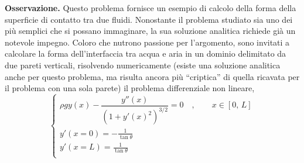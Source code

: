 \vspace{1.0cm}
\noindent
\textbf{Osservazione.} Questo problema fornisce un esempio di calcolo della forma della superficie di contatto tra due fluidi. Nonostante il problema studiato sia uno dei più semplici che si possano immaginare, la sua soluzione analitica richiede già un notevole impegno. Coloro che nutrono passione per l'argomento, sono invitati a calcolare la forma dell'interfaccia tra acqua e aria in un dominio delimitato da due pareti verticali, risolvendo numericamente (esiste una soluzione analitica anche per questo problema, ma risulta ancora più ``criptica'' di quella ricavata per il problema con una sola parete) il problema differenziale non lineare,
\begin{equation}
\begin{cases}
 \rho g y(x) - \dfrac{y''(x)}{\left( 1 + y'(x)^2 \right)^{3/2}} = 0 \quad , \qquad x \in [0,\,L] \\
 y'(x=0) = -\frac{1}{\tan\theta} \\
 y'(x=L) =  \frac{1}{\tan\theta} \\
\end{cases}
\end{equation}

